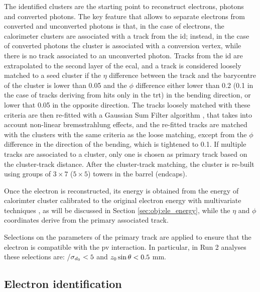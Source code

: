 The identified clusters are the starting point to reconstruct electrons, photons and converted photons. The key feature that allows to separate electrons from converted and unconverted photons is that, in the case of electrons, the calorimeter clusters are associated with a track from the \gls{id}; instead, in the case of converted photons the cluster is associated with a conversion vertex, while there is no track associated to an unconverted photon. Tracks from the \gls{id} are extrapolated to the second layer of the \gls{ecal}, and a track is considered loosely matched to a seed cluster if the $\eta$ difference between the track and the barycentre of the cluster is lower than 0.05 and the $\phi$ difference either lower than 0.2 (0.1 in the case of tracks deriving from hits only in the \gls{trt}) in the bending direction, or lower that 0.05 in the opposite direction. 
The tracks loosely matched with these criteria are then re-fitted with a Gaussian Sum Filter algorithm \cite{ATLAS:2012dma}, that takes into account non-linear bremsstrahlung effects, and the re-fitted tracks are matched with 
the clusters with the same criteria as the loose matching, except from the $\phi$ difference in the direction of the bending, which is tightened to 0.1. If multiple tracks are associated to a cluster, only one is chosen as primary track based on the cluster-track distance.
After the cluster-track matching, the cluster is re-built using groups of $3\times7$ ($5\times5$) towers in the barrel (endcaps). 

Once the electron is reconstructed, its energy is obtained from the energy of calorimter cluster calibrated to the 
original electron energy with multivariate techniques \cite{Aad:2014nim}, as will be discussed in Section \ref{sec:obj:ele_energy}, while the $\eta$ and $\phi$ coordinates 
derive from the primary associated track.

Selections on the parameters of the primary track are applied to ensure that the electron is compatible with the \gls{pv} interaction. 
In particular, in Run 2 analyses these selections are: \dzero/$\sigma_{d_0} < 5$ and  ${z_0} \sin\theta < 0.5$ mm.


\subsection{Electron identification}
\label{sec:elec_id}

